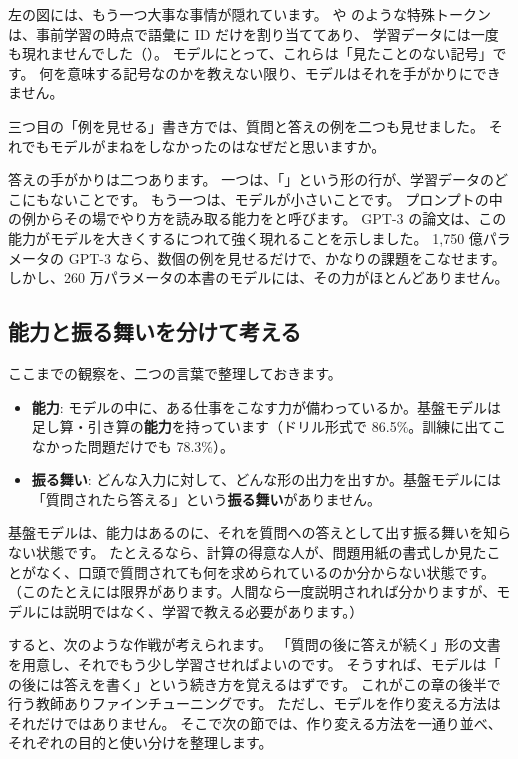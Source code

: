左の図には、もう一つ大事な事情が隠れています。
 や  のような特殊トークンは、事前学習の時点で語彙に ID だけを割り当ててあり、
学習データには一度も現れませんでした（）。
モデルにとって、これらは「見たことのない記号」です。
何を意味する記号なのかを教えない限り、モデルはそれを手がかりにできません。

\begin{quiz}
三つ目の「例を見せる」書き方では、質問と答えの例を二つも見せました。
それでもモデルがまねをしなかったのはなぜだと思いますか。
\end{quiz}

答えの手がかりは二つあります。
一つは、「」という形の行が、学習データのどこにもないことです。
もう一つは、モデルが小さいことです。
プロンプトの中の例からその場でやり方を読み取る能力をと呼びます。
GPT-3 の論文\cite{brown2020language}は、この能力がモデルを大きくするにつれて強く現れることを示しました。
1,750 億パラメータの GPT-3 なら、数個の例を見せるだけで、かなりの課題をこなせます。
しかし、260 万パラメータの本書のモデルには、その力がほとんどありません。

\subsection{能力と振る舞いを分けて考える}

ここまでの観察を、二つの言葉で整理しておきます。

\begin{itemize}
\item \textbf{能力}: モデルの中に、ある仕事をこなす力が備わっているか。基盤モデルは足し算・引き算の\textbf{能力}を持っています（ドリル形式で 86.5\%。訓練に出てこなかった問題だけでも 78.3\%）。
\item \textbf{振る舞い}: どんな入力に対して、どんな形の出力を出すか。基盤モデルには「質問されたら答える」という\textbf{振る舞い}がありません。
\end{itemize}

基盤モデルは、能力はあるのに、それを質問への答えとして出す振る舞いを知らない状態です。
たとえるなら、計算の得意な人が、問題用紙の書式しか見たことがなく、口頭で質問されても何を求められているのか分からない状態です。
（このたとえには限界があります。人間なら一度説明されれば分かりますが、モデルには説明ではなく、学習で教える必要があります。）

すると、次のような作戦が考えられます。
「質問の後に答えが続く」形の文書を用意し、それでもう少し学習させればよいのです。
そうすれば、モデルは「 の後には答えを書く」という続き方を覚えるはずです。
これがこの章の後半で行う教師ありファインチューニングです。
ただし、モデルを作り変える方法はそれだけではありません。
そこで次の節では、作り変える方法を一通り並べ、それぞれの目的と使い分けを整理します。

